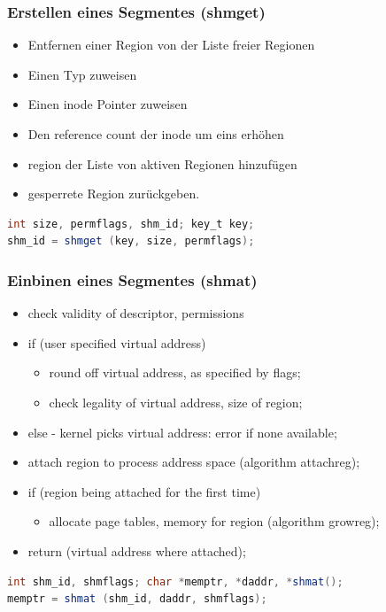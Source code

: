 \documentclass[10pt]{article}
\begin{document}
\subsubsection{Erstellen eines Segmentes (shmget)}
\begin{itemize}
	\item Entfernen einer Region von der Liste freier Regionen
	\item Einen Typ zuweisen
	\item Einen inode Pointer zuweisen
	\item Den reference count der inode um eins erhöhen
	\item region der Liste von aktiven Regionen hinzufügen
	\item gesperrete Region zurückgeben.
\end{itemize}
\begin{lstlisting}[language=Java, caption=Erstellen eines Shared Memory Segments, style=JavaStyle]
int size, permflags, shm_id; key_t key;
shm_id = shmget (key, size, permflags);
\end{lstlisting}

\subsubsection{Einbinen eines Segmentes (shmat)}
\begin{itemize}
	\item check validity of descriptor, permissions 
	\item if (user specified virtual address)
		\begin{itemize}
			\item round off virtual address, as specified by flags;
			\item check legality of virtual address, size of region;
		\end{itemize}
	\item else - kernel picks virtual address: error if none available;
	\item attach region to process address space (algorithm attachreg);
	\item if (region being attached for the first time)
		\begin{itemize}
			\item allocate page tables, memory for region (algorithm growreg);
		\end{itemize}
	\item return (virtual address where attached);
\end{itemize}
\begin{lstlisting}[language=Java, caption=Einbindung eines Shared Memory Segments, style=JavaStyle]
int shm_id, shmflags; char *memptr, *daddr, *shmat();
memptr = shmat (shm_id, daddr, shmflags);
\end{lstlisting}
\end{document}
